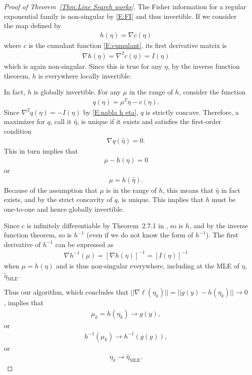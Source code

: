 \documentclass[oneside]{myumnStatThesis}
\newcommand{\etaMLE}{\hat{\eta}_{\textrm{MLE}}}
\begin{document}
\begin{proof}[Proof of Theorem~\ref{Thm:Line Search works}]

The Fisher information for a regular exponential family is non-singular by \eqref{E:FI} and thus invertible.  If we 
consider the map defined by
\begin{align*}
	h(\eta) = \nabla c(\eta)
\end{align*}
where $c$ is the cumulant function \eqref{E:cumulant}, its first derivative matrix is
\begin{align}
	\nabla h(\eta) = \nabla^2 c(\eta) = I(\eta) \label{E:nabla h eta}
\end{align}
which is again non-singular.  Since this is true for any $\eta$, by the inverse function theorem, $h$ is everywhere 
locally invertible.

In fact, $h$ is globally invertible. For any $\mu$ in the range of $h$, consider the function
\begin{align*}
	q(\eta) = \mu^T\eta - c(\eta).
\end{align*}
Since $\nabla^2 q(\eta) = - I(\eta)$ by \eqref{E:nabla h eta}, $q$ is strictly concave.  Therefore, a maximizer for $q
$, call it $\hat{\eta}$, is unique if it exists and satisfies the first-order condition
\begin{align*}
	\nabla q( \hat{\eta} ) = 0.
\end{align*}
This in turn implies that
\begin{align*}
	\mu - h(\hat{\eta}) = 0
\end{align*} 
or
\begin{align*}
	\mu = h( \hat{\eta} ). \label{E:eta hat}
\end{align*}
Because of the assumption that $\mu$ is in the range of $h$, this means that $\hat{\eta}$ in fact exists, and by the 
strict concavity of $q$, is unique.  This implies that $h$ must be one-to-one and hence globally invertible.


Since $c$ is infinitely differentiable by Theorem~2.7.1 in \citet{TSH}, so is $h$, and by the inverse function theorem, 
so is $h^{-1}$ (even if we do not know the form of $h^{-1}$).  The first derivative of $h^{-1}$ can be expressed as
\begin{align*}
	\nabla h^{-1}(\mu) = \left [ \nabla h(\eta) \right ]^{-1} = \left [ I(\eta) \right ]^{-1}
\end{align*}
when $\mu = h(\eta)$ and is thus non-singular everywhere, including at the MLE of $\eta$, $\etaMLE$.

Thus our algorithm, which concludes that $ || \nabla \ell( \eta_k) ||  = || g(y) - h(\eta_k) || \to 0$, implies that 
\begin{align*}
	\mu_k = h(\eta_k) \to g(y), 
\end{align*}
or
\begin{align*}
	h^{-1}(\mu_k)  \to h^{-1}\left (g(y) \right),
\end{align*}
or
\begin{align*}
	\eta_k  \to  \etaMLE.
\end{align*}

\end{proof}
\end{document}
